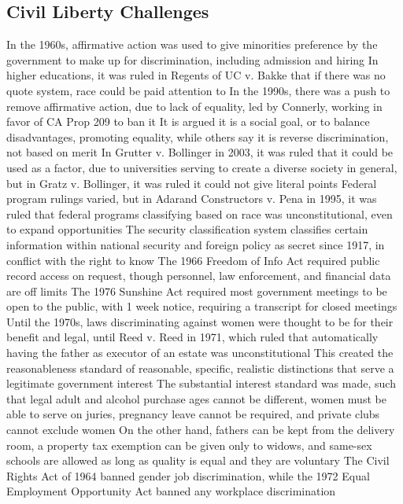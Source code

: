 \documentclass[11 pt, twoside]{article}
\newenvironment{outline*}
{
	\begin{outline}[enumerate]
	}
	{\end{outline}
}
\begin{document}
\subsection{Civil Liberty Challenges}
\begin{outline*}
\1 In the 1960s, affirmative action was used to give minorities preference by the government to make up for discrimination, including admission and hiring
\2 In higher educations, it was ruled in Regents of UC v. Bakke that if there was no quote system, race could be paid attention to
\2 In the 1990s, there was a push to remove affirmative action, due to lack of equality, led by Connerly, working in favor of CA Prop 209 to ban it
\2 It is argued it is a social goal, or to balance disadvantages, promoting equality, while others say it is reverse discrimination, not based on merit
\2 In Grutter v. Bollinger in 2003, it was ruled that it could be used as a factor, due to universities serving to create a diverse society in general, but in Gratz v. Bollinger, it was ruled it could not give literal points
\2 Federal program rulings varied, but in Adarand Constructors v. Pena in 1995, it was ruled that federal programs classifying based on race was unconstitutional, even to expand opportunities
\1 The security classification system classifies certain information within national security and foreign policy as secret since 1917, in conflict with the right to know
\2 The 1966 Freedom of Info Act required public record access on request, though personnel, law enforcement, and financial data are off limits
\2 The 1976 Sunshine Act required most government meetings to be open to the public, with 1 week notice, requiring a transcript for closed meetings
\1 Until the 1970s, laws discriminating against women were thought to be for their benefit and legal, until Reed v. Reed in 1971, which ruled that automatically having the father as executor of an estate was unconstitutional
\2 This created the reasonableness standard of reasonable, specific, realistic distinctions that serve a legitimate government interest
\1 The substantial interest standard was made, such that legal adult and alcohol purchase ages cannot be different, women must be able to serve on juries, pregnancy leave cannot be required, and private clubs cannot exclude women
\2 On the other hand, fathers can be kept from the delivery room, a property tax exemption can be given only to widows, and same-sex schools are allowed as long as quality is equal and they are voluntary
\1 The Civil Rights Act of 1964 banned gender job discrimination, while the 1972 Equal Employment Opportunity Act banned any workplace discrimination

\end{outline*}
\end{document}
